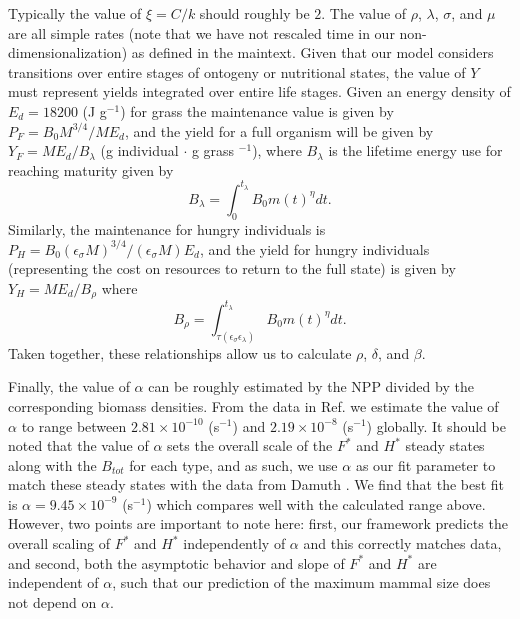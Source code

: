 \documentclass[twocolumn,preprintnumbers,amsmath,amssymb,superscriptaddress]{revtex4}
\begin{document}
\begin{bibunit}[unsrt]
Typically the value of $\xi=C/k$ should roughly be $2$. The value of $\rho$, $\lambda$, $\sigma$, and $\mu$ are all simple rates (note that we have not rescaled time in our non-dimensionalization) as defined in the maintext. Given that our model considers transitions over entire stages of ontogeny or nutritional states, the value of $Y$ must represent yields integrated over entire life stages. Given an energy density of $E_{d}=18200$ (J g$^{-1}$) for grass \citep{estermann} the maintenance value is given by $P_{F}=B_{0}M^{3/4}/ME_{d}$, and the yield for a full organism will be given by $Y_{F}=ME_{d}/B_{\lambda}$ (g individual $\cdot$ g grass $^{-1}$), where $B_{\lambda}$ is the lifetime energy use for reaching maturity given by
\begin{equation}
B_{\lambda}=\int_{0}^{t_{\lambda}}B_{0}m\left(t\right)^{\eta}dt.
\end{equation}
Similarly, the maintenance for hungry individuals is $P_{H}=B_{0}(\epsilon_{\sigma}M)^{3/4}/(\epsilon_{\sigma}M)E_{d}$, and the yield for hungry individuals (representing the cost on resources to return to the full state) is given by $Y_{H}=ME_{d}/B_{\rho}$ where
\begin{equation}
B_{\rho}=\int_{\tau\left(\epsilon_{\sigma}\epsilon_{\lambda}\right)}^{t_{\lambda}}B_{0}m\left(t\right)^{\eta}dt.
\end{equation}
Taken together, these relationships allow us to calculate $\rho$, $\delta$, and $\beta$.

Finally, the value of $\alpha$ can be roughly estimated by the NPP divided by the corresponding biomass densities. From the data in Ref. \citep{michaletz2014convergence} we estimate the value of $\alpha$ to range between $2.81\times10^{-10}$ (s$^{-1}$) and $2.19\times10^{-8}$ (s$^{-1}$) globally. It should be noted that the value of $\alpha$ sets the overall scale of the $F^{*}$ and $H^{*}$ steady states along with the $B_{tot}$ for each type, and as such, we use $\alpha$ as our fit parameter to match these steady states with the data from Damuth \citep{damuth1987interspecific}. We find that the best fit is $\alpha=9.45\times10^{-9}$ (s$^{-1}$) which compares well with the calculated range above. However, two points are important to note here: first, our framework predicts the overall scaling of $F^{*}$ and $H^{*}$ independently of $\alpha$ and this correctly matches data, and second, both the asymptotic behavior and slope of $F^{*}$ and $H^{*}$ are independent of $\alpha$, such that our prediction of the maximum mammal size does not depend on $\alpha$.
\\


\end{bibunit}
\end{document}
